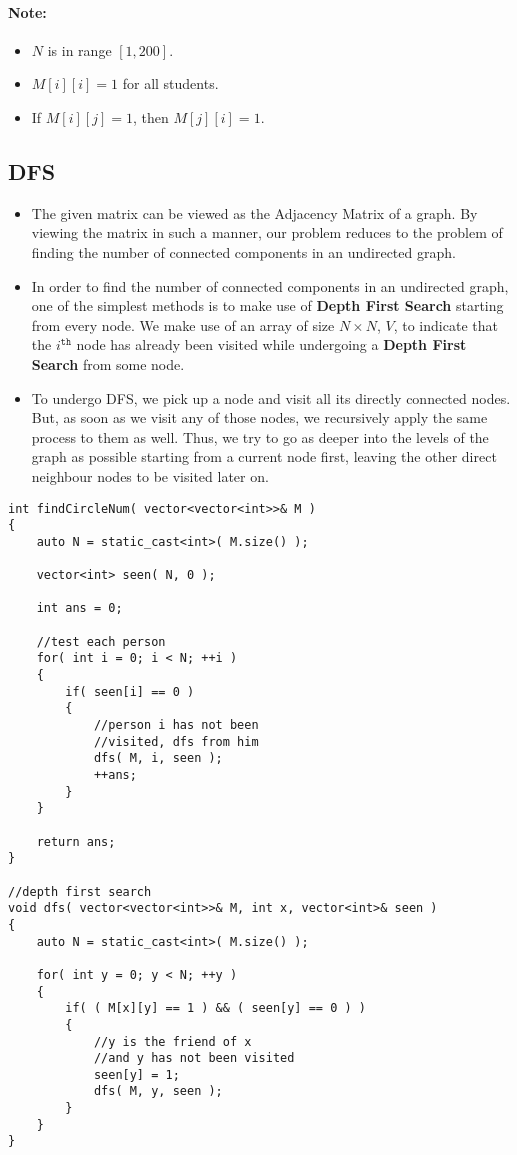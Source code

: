 \paragraph{Note:}
\begin{itemize}
\item $N$ is in range $[1,200]$.
\item $M[i][i] = 1$ for all students.
\item If $M[i][j] = 1$, then $M[j][i] = 1$.
\end{itemize}

\subsection{DFS}
\begin{itemize}
\item The given matrix can be viewed as the Adjacency Matrix of a graph. By viewing the matrix in such a manner, our problem reduces to the problem of finding the number of connected components in an undirected graph.
\item In order to find the number of connected components in an undirected graph, one of the simplest methods is to make use of \textbf{Depth First Search} starting from every node. We make use of an array of size $N\times N$, $V$, to indicate that the $i^{\texttt{th}}$ node has already been visited while undergoing a \textbf{Depth First Search} from some node.
\item To undergo DFS, we pick up a node and visit all its directly connected nodes. But, as soon as we visit any of those nodes, we recursively apply the same process to them as well. Thus, we try to go as deeper into the levels of the graph as possible starting from a current node first, leaving the other direct neighbour nodes to be visited later on.
\end{itemize}

\setcounter{lstlisting}{0}
\begin{lstlisting}[style=customc, caption={DFS}]
int findCircleNum( vector<vector<int>>& M )
{
    auto N = static_cast<int>( M.size() );

    vector<int> seen( N, 0 );

    int ans = 0;

    //test each person
    for( int i = 0; i < N; ++i )
    {
        if( seen[i] == 0 )
        {
            //person i has not been
            //visited, dfs from him
            dfs( M, i, seen );
            ++ans;
        }
    }

    return ans;
}

//depth first search
void dfs( vector<vector<int>>& M, int x, vector<int>& seen )
{
    auto N = static_cast<int>( M.size() );

    for( int y = 0; y < N; ++y )
    {
        if( ( M[x][y] == 1 ) && ( seen[y] == 0 ) )
        {
            //y is the friend of x
            //and y has not been visited
            seen[y] = 1;
            dfs( M, y, seen );
        }
    }
}
\end{lstlisting}

